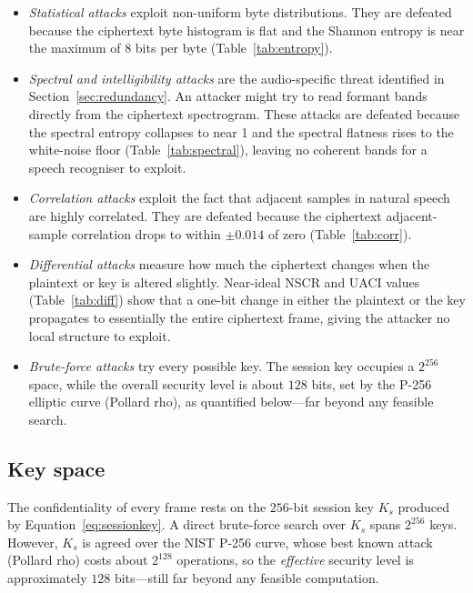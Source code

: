 \documentclass[pdflatex,sn-mathphys-num]{sn-jnl}%
\theoremstyle{thmstyleone}%
\theoremstyle{thmstyletwo}%
\theoremstyle{thmstylethree}%
\begin{document}
\begin{itemize}[leftmargin=2em]
\item \emph{Statistical attacks} exploit non-uniform byte distributions. They are defeated because the ciphertext byte histogram is flat and the Shannon entropy is near the maximum of 8 bits per byte (Table~\ref{tab:entropy}).

\item \emph{Spectral and intelligibility attacks} are the audio-specific threat identified in Section~\ref{sec:redundancy}. An attacker might try to read formant bands directly from the ciphertext spectrogram. These attacks are defeated because the spectral entropy collapses to near 1 and the spectral flatness rises to the white-noise floor (Table~\ref{tab:spectral}), leaving no coherent bands for a speech recogniser to exploit.

\item \emph{Correlation attacks} exploit the fact that adjacent samples in natural speech are highly correlated. They are defeated because the ciphertext adjacent-sample correlation drops to within $\pm0.014$ of zero (Table~\ref{tab:corr}).

\item \emph{Differential attacks} measure how much the ciphertext changes when the plaintext or key is altered slightly. Near-ideal NSCR and UACI values (Table~\ref{tab:diff}) show that a one-bit change in either the plaintext or the key propagates to essentially the entire ciphertext frame, giving the attacker no local structure to exploit.

\item \emph{Brute-force attacks} try every possible key. The session key occupies a $2^{256}$ space, while the overall security level is about $128$ bits, set by the P-256 elliptic curve (Pollard rho), as quantified below---far beyond any feasible search.
\end{itemize}

\subsection{Key space}
\label{sec:keyspace}

The confidentiality of every frame rests on the $256$-bit session key $K_s$ produced by Equation~\eqref{eq:sessionkey}. A direct brute-force search over $K_s$ spans $2^{256}$ keys. However, $K_s$ is agreed over the NIST P-256 curve, whose best known attack (Pollard rho) costs about $2^{128}$ operations, so the \emph{effective} security level is approximately $128$ bits---still far beyond any feasible computation.
\end{document}
